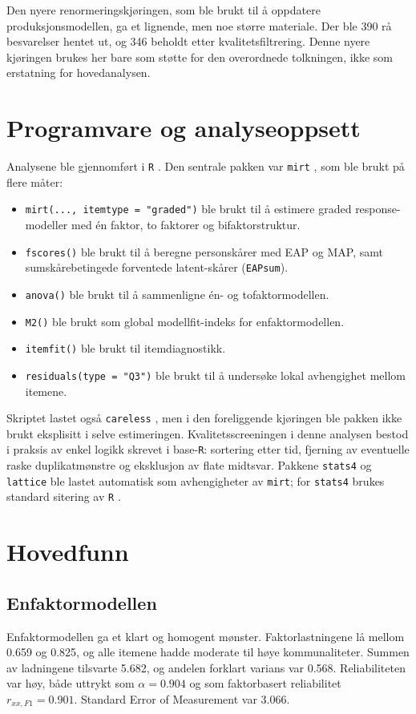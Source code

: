 \documentclass[11pt,a4paper]{article}
\begin{document}
Den nyere renormeringskjøringen, som ble brukt til å oppdatere produksjonsmodellen, ga et lignende, men noe større materiale. Der ble 390 rå besvarelser hentet ut, og 346 beholdt etter kvalitetsfiltrering. Denne nyere kjøringen brukes her bare som støtte for den overordnede tolkningen, ikke som erstatning for hovedanalysen.

\section{Programvare og analyseoppsett}
Analysene ble gjennomført i \texttt{R} \parencite{RCore2026}. Den sentrale pakken var \texttt{mirt} \parencite{Chalmers2012mirt}, som ble brukt på flere måter:

\begin{itemize}
\item \texttt{mirt(..., itemtype = "graded")} ble brukt til å estimere graded response-modeller med én faktor, to faktorer og bifaktorstruktur.
\item \texttt{fscores()} ble brukt til å beregne personskårer med EAP og MAP, samt sumskårebetingede forventede latent-skårer (\texttt{EAPsum}).
\item \texttt{anova()} ble brukt til å sammenligne én- og tofaktormodellen.
\item \texttt{M2()} ble brukt som global modellfit-indeks for enfaktormodellen.
\item \texttt{itemfit()} ble brukt til itemdiagnostikk.
\item \texttt{residuals(type = "Q3")} ble brukt til å undersøke lokal avhengighet mellom itemene.
\end{itemize}

Skriptet lastet også \texttt{careless} \parencite{YentesWilhelm2023careless}, men i den foreliggende kjøringen ble pakken ikke brukt eksplisitt i selve estimeringen. Kvalitetsscreeningen i denne analysen bestod i praksis av enkel logikk skrevet i base-\texttt{R}: sortering etter tid, fjerning av eventuelle raske duplikatmønstre og eksklusjon av flate midtsvar. Pakkene \texttt{stats4} og \texttt{lattice} \parencite{Sarkar2008lattice} ble lastet automatisk som avhengigheter av \texttt{mirt}; for \texttt{stats4} brukes standard sitering av \texttt{R} \parencite{RCore2026}.

\section{Hovedfunn}
\subsection{Enfaktormodellen}
Enfaktormodellen ga et klart og homogent mønster. Faktorlastningene lå mellom 0.659 og 0.825, og alle itemene hadde moderate til høye kommunaliteter. Summen av ladningene tilsvarte 5.682, og andelen forklart varians var 0.568. Reliabiliteten var høy, både uttrykt som $\alpha = 0.904$ og som faktorbasert reliabilitet $r_{xx,F1} = 0.901$. Standard Error of Measurement var 3.066.
\end{document}

